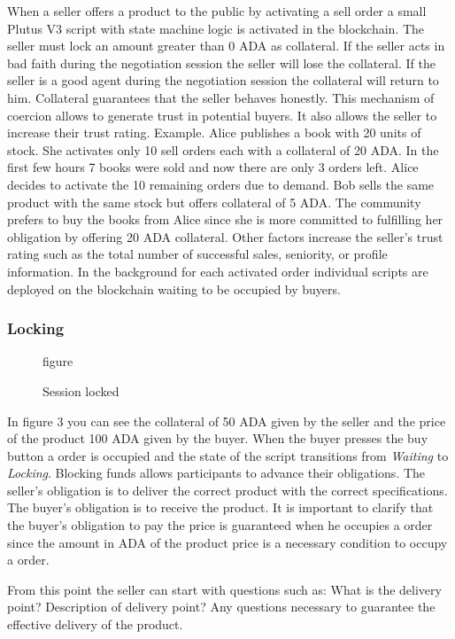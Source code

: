 \documentclass[12pt]{article}
\begin{document}
When a seller offers a product to the public by activating a sell order a small Plutus V3 script with state machine logic is activated in the blockchain.
The seller must lock an amount greater than 0 ADA as collateral. 
If the seller acts in bad faith during the negotiation session the seller will lose the collateral.
If the seller is a good agent during the negotiation session the collateral will return to him.
Collateral guarantees that the seller behaves honestly.
This mechanism of coercion allows to generate trust in potential buyers. 
It also allows the seller to increase their trust rating. Example. Alice publishes a book with 20 units of stock.
She activates only 10 sell orders each with a collateral of 20 ADA.
In the first few hours 7 books were sold and now there are only 3 orders left.
Alice decides to activate the 10 remaining orders due to demand.
Bob sells the same product with the same stock but offers collateral of 5 ADA. The community prefers to buy the books from Alice since she is more committed to fulfilling her obligation by offering 20 ADA collateral.
Other factors increase the seller's trust rating such as the total number of successful sales, seniority, or profile information.
In the background for each activated order individual scripts are deployed on the blockchain waiting to be occupied by buyers.

\subsubsection { Locking }

\begin{figure}[ht]
  \centering
figure
  \caption{Session locked}
  \label{fig:locking}
\end{figure}


In figure 3 you can see the collateral of 50 ADA given by the seller and the price of the product 100 ADA given by the buyer.
When the buyer presses the buy button a order is occupied and the state of the script transitions from \emph{Waiting} to \emph{Locking}.
Blocking funds allows participants to advance their obligations.
The seller's obligation is to deliver the correct product with the correct specifications. The buyer's obligation is to receive the product.
It is important to clarify that the buyer's obligation to pay the price is guaranteed when he occupies a order since the amount in ADA of the product price is a necessary condition to occupy a order.

From this point the seller can start with questions such as: What is the delivery point? Description of delivery point? Any questions necessary to guarantee the effective delivery of the product.
\end{document}
